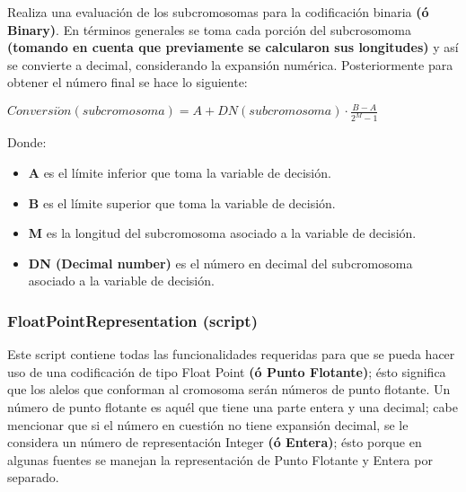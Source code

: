 \documentclass[class=report, crop=false]{standalone}
\begin{document}
\begin{fulllineitems}

Realiza una evaluación de los subcromosomas para la codificación 
binaria \textbf{(ó Binary)}.\break
En términos generales se toma cada porción del subcrosomoma 
\textbf{(tomando en cuenta que previamente se calcularon sus longitudes)} 
y así se convierte a decimal, considerando la expansión numérica.\break
Posteriormente para obtener el número final se hace lo siguiente:

\begin{center}\(Conversi\acute{o}n(subcromosoma) = A + DN(subcromosoma) \cdot \frac{B - A}{2^M - 1}\)
\end{center}

Donde:

\begin{itemize}
\item \textbf{A} es el límite inferior que toma la variable de 
decisión.
\item \textbf{B} es el límite superior que toma la variable de 
decisión.
\item \textbf{M} es la longitud del subcromosoma asociado a la 
variable de decisión.
\item \textbf{DN (Decimal number)} es el número en decimal del 
subcromosoma asociado a la variable de decisión.
\end{itemize}

\end{fulllineitems}

\subsubsection{FloatPointRepresentation (script)}
\label{sec:a_2_1_2}
Este script contiene todas las funcionalidades requeridas para 
que se pueda hacer uso de una codificación de tipo Float Point 
\textbf{(ó Punto Flotante)}; ésto significa que los alelos que 
conforman al cromosoma serán números de punto flotante.\break
Un número de punto flotante es aquél que tiene una parte entera 
y una decimal; cabe mencionar que si el número en cuestión no 
tiene expansión decimal, se le considera un número de representación 
Integer \textbf{(ó Entera)}; ésto porque en algunas fuentes se 
manejan la representación de Punto Flotante y Entera por separado.
\end{document}
